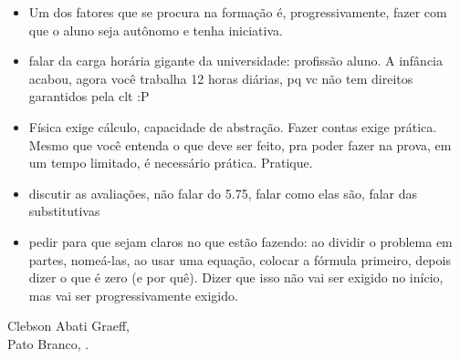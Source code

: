 \begin{itemize}
\item Um dos fatores que se procura na formação é, progressivamente, fazer com que o aluno seja autônomo e tenha iniciativa.

\item falar da carga horária gigante da universidade: profissão aluno. A infância acabou, agora você trabalha 12 horas diárias, pq vc não tem direitos garantidos pela clt :P

\item Física exige cálculo, capacidade de abstração. Fazer contas exige prática. Mesmo que você entenda o que deve ser feito, pra poder fazer na prova, em um tempo limitado, é necessário prática. Pratique.

\item discutir as avaliações, não falar do 5.75, falar como elas são, falar das substitutivas

\item pedir para que sejam claros no que estão fazendo: ao dividir o problema em partes, nomeá-las, ao usar uma equação, colocar a fórmula primeiro, depois dizer o que é zero (e por quê). Dizer que isso não vai ser exigido no início, mas vai ser progressivamente exigido.
\end{itemize}

\vspace{1cm}
\begin{flushright}
Clebson Abati Graeff,\\
Pato Branco, \monthyear.
\end{flushright}

